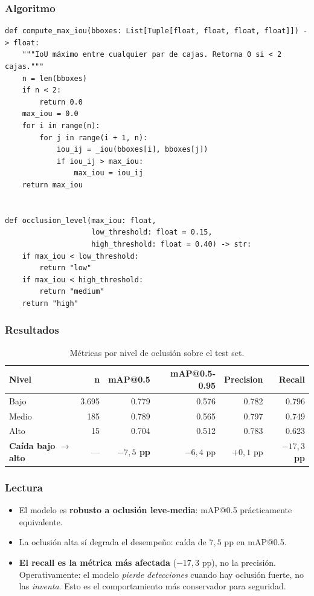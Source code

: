 \documentclass[11pt,a4paper]{article}
\begin{document}
\subsubsection{Algoritmo}

\begin{lstlisting}[caption={Cálculo de IoU máximo por imagen
(\texttt{src/analysis/occlusion.py}).}]
def compute_max_iou(bboxes: List[Tuple[float, float, float, float]]) -> float:
    """IoU máximo entre cualquier par de cajas. Retorna 0 si < 2 cajas."""
    n = len(bboxes)
    if n < 2:
        return 0.0
    max_iou = 0.0
    for i in range(n):
        for j in range(i + 1, n):
            iou_ij = _iou(bboxes[i], bboxes[j])
            if iou_ij > max_iou:
                max_iou = iou_ij
    return max_iou


def occlusion_level(max_iou: float,
                    low_threshold: float = 0.15,
                    high_threshold: float = 0.40) -> str:
    if max_iou < low_threshold:
        return "low"
    if max_iou < high_threshold:
        return "medium"
    return "high"
\end{lstlisting}

\subsubsection{Resultados}

\begin{table}[H]
\centering
\caption{Métricas por nivel de oclusión sobre el test set.}
\begin{tabular}{l r r r r r}
\toprule
\textbf{Nivel} & \textbf{n} & \textbf{mAP@0.5} & \textbf{mAP@0.5-0.95}
& \textbf{Precision} & \textbf{Recall} \\
\midrule
Bajo & 3.695 & 0.779 & 0.576 & 0.782 & 0.796 \\
Medio & 185 & 0.789 & 0.565 & 0.797 & 0.749 \\
Alto & 15 & 0.704 & 0.512 & 0.783 & 0.623 \\
\midrule
\textbf{Caída bajo $\to$ alto} & — & \textbf{$-7{,}5$ pp} & $-6{,}4$ pp
& $+0{,}1$ pp & \textbf{$-17{,}3$ pp} \\
\bottomrule
\end{tabular}
\end{table}

\subsubsection{Lectura}

\begin{itemize}[leftmargin=*]
    \item El modelo es \textbf{robusto a oclusión leve-media}: mAP@0.5
    prácticamente equivalente.
    \item La oclusión alta sí degrada el desempeño: caída de
    $7{,}5$ pp en mAP@0.5.
    \item \textbf{El recall es la métrica más afectada}
    ($-17{,}3$ pp), no la precisión. Operativamente: el modelo
    \emph{pierde detecciones} cuando hay oclusión fuerte, no las
    \emph{inventa}. Esto es el comportamiento más conservador para
    seguridad.
\end{itemize}
\end{document}
